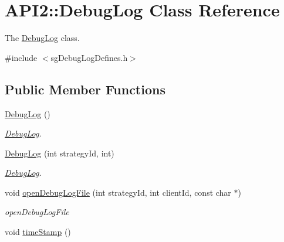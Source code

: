 \hypertarget{class_a_p_i2_1_1_debug_log}{\section{A\-P\-I2\-:\-:Debug\-Log Class Reference}
\label{class_a_p_i2_1_1_debug_log}
}


The \hyperlink{class_a_p_i2_1_1_debug_log}{Debug\-Log} class.  




{\ttfamily \#include $<$sg\-Debug\-Log\-Defines.\-h$>$}

\subsection*{Public Member Functions}
\begin{DoxyCompactItemize}
\item 
\hypertarget{class_a_p_i2_1_1_debug_log_ab8203c83ead7ad11a7bcc067cee4ef90}{\hyperlink{class_a_p_i2_1_1_debug_log_ab8203c83ead7ad11a7bcc067cee4ef90}{Debug\-Log} ()}\label{class_a_p_i2_1_1_debug_log_ab8203c83ead7ad11a7bcc067cee4ef90}

\begin{DoxyCompactList}\small\item\em \hyperlink{class_a_p_i2_1_1_debug_log}{Debug\-Log}. \end{DoxyCompactList}\item 
\hyperlink{class_a_p_i2_1_1_debug_log_a4c182209fbfb84b73f2d4adbf49f0f7e}{Debug\-Log} (int strategy\-Id, int)
\begin{DoxyCompactList}\small\item\em \hyperlink{class_a_p_i2_1_1_debug_log}{Debug\-Log}. \end{DoxyCompactList}\item 
void \hyperlink{class_a_p_i2_1_1_debug_log_adeb93ee69bf2cf50082fd2cdd0445fd1}{open\-Debug\-Log\-File} (int strategy\-Id, int client\-Id, const char $\ast$)
\begin{DoxyCompactList}\small\item\em open\-Debug\-Log\-File \end{DoxyCompactList}\item 
\hypertarget{class_a_p_i2_1_1_debug_log_ab5da3dff31cbaaf1431b07cb1b0ddb3a}{void \hyperlink{class_a_p_i2_1_1_debug_log_ab5da3dff31cbaaf1431b07cb1b0ddb3a}{time\-Stamp} ()}\label{class_a_p_i2_1_1_debug_log_ab5da3dff31cbaaf1431b07cb1b0ddb3a}


\end{DoxyCompactItemize}
